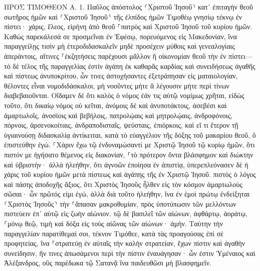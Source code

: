 \documentclass[twoside, 9pt]{extreport}
\begin{document}
ΠΡΟΣ ΤΙΜΟΘΕΟΝ Α.
1.
Παῦλος ἀπόστολος ⸂Χριστοῦ Ἰησοῦ⸃ κατ᾽ ἐπιταγὴν θεοῦ σωτῆρος ἡμῶν καὶ ⸂Χριστοῦ Ἰησοῦ⸃ τῆς ἐλπίδος ἡμῶν 
Τιμοθέῳ γνησίῳ τέκνῳ ἐν πίστει· χάρις, ἔλεος, εἰρήνη ἀπὸ θεοῦ ⸀πατρὸς καὶ Χριστοῦ Ἰησοῦ τοῦ κυρίου ἡμῶν. 
Καθὼς παρεκάλεσά σε προσμεῖναι ἐν Ἐφέσῳ, πορευόμενος εἰς Μακεδονίαν, ἵνα παραγγείλῃς τισὶν μὴ ἑτεροδιδασκαλεῖν 
μηδὲ προσέχειν μύθοις καὶ γενεαλογίαις ἀπεράντοις, αἵτινες ⸀ἐκζητήσεις παρέχουσι μᾶλλον ἢ οἰκονομίαν θεοῦ τὴν ἐν πίστει— 
τὸ δὲ τέλος τῆς παραγγελίας ἐστὶν ἀγάπη ἐκ καθαρᾶς καρδίας καὶ συνειδήσεως ἀγαθῆς καὶ πίστεως ἀνυποκρίτου, 
ὧν τινες ἀστοχήσαντες ἐξετράπησαν εἰς ματαιολογίαν, 
θέλοντες εἶναι νομοδιδάσκαλοι, μὴ νοοῦντες μήτε ἃ λέγουσιν μήτε περὶ τίνων διαβεβαιοῦνται. 
Οἴδαμεν δὲ ὅτι καλὸς ὁ νόμος ἐάν τις αὐτῷ νομίμως χρῆται, 
εἰδὼς τοῦτο, ὅτι δικαίῳ νόμος οὐ κεῖται, ἀνόμοις δὲ καὶ ἀνυποτάκτοις, ἀσεβέσι καὶ ἁμαρτωλοῖς, ἀνοσίοις καὶ βεβήλοις, πατρολῴαις καὶ μητρολῴαις, ἀνδροφόνοις, 
πόρνοις, ἀρσενοκοίταις, ἀνδραποδισταῖς, ψεύσταις, ἐπιόρκοις, καὶ εἴ τι ἕτερον τῇ ὑγιαινούσῃ διδασκαλίᾳ ἀντίκειται, 
κατὰ τὸ εὐαγγέλιον τῆς δόξης τοῦ μακαρίου θεοῦ, ὃ ἐπιστεύθην ἐγώ. 
⸀Χάριν ἔχω τῷ ἐνδυναμώσαντί με Χριστῷ Ἰησοῦ τῷ κυρίῳ ἡμῶν, ὅτι πιστόν με ἡγήσατο θέμενος εἰς διακονίαν, 
⸀τὸ πρότερον ὄντα βλάσφημον καὶ διώκτην καὶ ὑβριστήν· ἀλλὰ ἠλεήθην, ὅτι ἀγνοῶν ἐποίησα ἐν ἀπιστίᾳ, 
ὑπερεπλεόνασεν δὲ ἡ χάρις τοῦ κυρίου ἡμῶν μετὰ πίστεως καὶ ἀγάπης τῆς ἐν Χριστῷ Ἰησοῦ. 
πιστὸς ὁ λόγος καὶ πάσης ἀποδοχῆς ἄξιος, ὅτι Χριστὸς Ἰησοῦς ἦλθεν εἰς τὸν κόσμον ἁμαρτωλοὺς σῶσαι· ὧν πρῶτός εἰμι ἐγώ, 
ἀλλὰ διὰ τοῦτο ἠλεήθην, ἵνα ἐν ἐμοὶ πρώτῳ ἐνδείξηται ⸂Χριστὸς Ἰησοῦς⸃ τὴν ⸀ἅπασαν μακροθυμίαν, πρὸς ὑποτύπωσιν τῶν μελλόντων πιστεύειν ἐπ᾽ αὐτῷ εἰς ζωὴν αἰώνιον. 
τῷ δὲ βασιλεῖ τῶν αἰώνων, ἀφθάρτῳ, ἀοράτῳ, ⸀μόνῳ θεῷ, τιμὴ καὶ δόξα εἰς τοὺς αἰῶνας τῶν αἰώνων· ἀμήν. 
Ταύτην τὴν παραγγελίαν παρατίθεμαί σοι, τέκνον Τιμόθεε, κατὰ τὰς προαγούσας ἐπὶ σὲ προφητείας, ἵνα ⸀στρατεύῃ ἐν αὐταῖς τὴν καλὴν στρατείαν, 
ἔχων πίστιν καὶ ἀγαθὴν συνείδησιν, ἥν τινες ἀπωσάμενοι περὶ τὴν πίστιν ἐναυάγησαν· 
ὧν ἐστιν Ὑμέναιος καὶ Ἀλέξανδρος, οὓς παρέδωκα τῷ Σατανᾷ ἵνα παιδευθῶσι μὴ βλασφημεῖν. 
\end{document}
